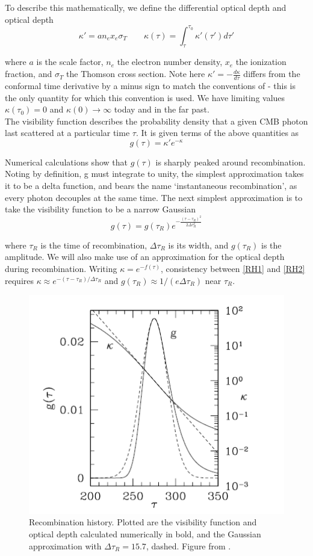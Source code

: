 \documentclass[a4paper,10pt]{article}
\begin{document}
To describe this mathematically, we define the differential optical depth and optical depth
\begin{equation}
\kappa' = an_ex_e\sigma_T \qquad \kappa(\tau) = \int_\tau^{\tau_0} \kappa'(\tau')d\tau'
\end{equation}

where $a$ is the scale factor, $n_e$ the electron number density, $x_e$ the ionization fraction, and $\sigma_T$ the Thomson cross section. Note here $\kappa' = -\frac{d\kappa}{d\tau}$ differs from the conformal time derivative by a minus sign to match the conventions of \cite{LoS, all-sky} - this is the only quantity for which this convention is used. We have limiting values $\kappa(\tau_0) = 0$ and $\kappa(0)\rightarrow \infty$ today and in the far past.\\

The visibility function describes the probability density that a given CMB photon last scattered at a particular time $\tau$. It is given terms of the above quantities as
\begin{equation}
g(\tau) = \kappa'e^{-\kappa}
\label{RH1}
\end{equation}

Numerical calculations show that $g(\tau)$ is sharply peaked around recombination. Noting by definition, g must integrate to unity, the simplest approximation takes it to be a delta function, and bears the name `instantaneous recombination', as every photon decouples at the same time. The next simplest approximation is to take the visibility function to be a narrow Gaussian
\begin{equation}
g(\tau) = g(\tau_R)e^{-\frac{(\tau-\tau_R)^2}{2\Delta\tau_R^2}}
\label{RH2}
\end{equation}

where $\tau_R$ is the time of recombination, $\Delta\tau_R$ is its width, and $g(\tau_R)$ is the amplitude. We will also make use of an approximation for the optical depth during recombination. Writing $\kappa = e^{-f(\tau)}$, consistency between \ref{RH1} and \ref{RH2} requires $\kappa \approx e^{-(\tau-\tau_R) / \Delta\tau_R}$ and $g(\tau_R)\approx 1/(e\Delta\tau_R)$ near $\tau_R$. 

\begin{figure}[h]
  \includegraphics[width=0.4\linewidth]{recombinationhistory.png}
  \centering
  \caption{Recombination history. Plotted are the visibility function and optical depth calculated numerically in bold, and the Gaussian approximation with $\Delta\tau_R=15.7$, dashed. Figure from \cite{Pritchard}. }
\end{figure}
\end{document}
